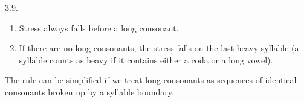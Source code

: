 \begin{refsection}
\begin{practiceproblemsolution}{3.9. \langnameLigurian}

\begin{enumerate}
    \item Stress always falls before a long consonant.
    \item If there are no long consonants, the stress falls on the last heavy syllable (a syllable counts as heavy if it contains either a coda or a long vowel).
\end{enumerate}

The rule can be simplified if we treat long consonants as sequences of identical consonants broken up by a syllable boundary.
\end{practiceproblemsolution}


\nocite{LadefogedJohnson2014, LadefogedMaddieson1996, Setter2021}
\FurtherReadingBox{}
\end{refsection}
